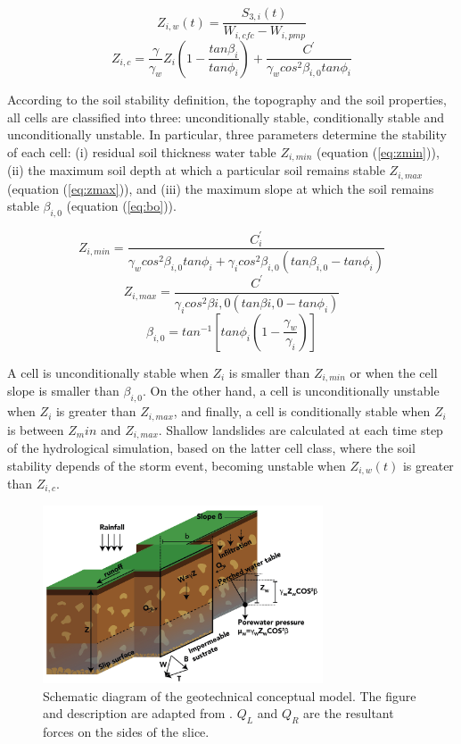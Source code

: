 \documentclass[hess, manuscript]{copernicus}
\begin{document}
\begin{equation}
 Z_{i,w}(t) = \frac{S_{3,i}(t)}{W_{i,cfc} - W_{i,pmp}}
 \label{eq:z}
\end{equation}
\begin{equation}
 Z_{i,c} = \frac{\gamma}{\gamma_w} Z_i \left( 1-\frac{tan \beta_i}{tan\phi_i} \right)
     + \frac{C^{'}}{\gamma_w cos^2 \beta_{i,0} tan\phi_i}
 \label{eq:Zcrit}
\end{equation}

According to the soil stability definition, the topography and the soil properties, all cells are classified into three: unconditionally stable, conditionally stable and unconditionally unstable. In particular, three parameters determine the stability of each cell: (i) residual soil thickness water table $Z_{i,min}$ (equation (\ref{eq:zmin})), (ii) the maximum soil depth at which a particular soil remains stable $Z_{i,max}$ (equation (\ref{eq:zmax})), and (iii) the maximum slope at which the soil remains stable $\beta_{i,0}$ (equation (\ref{eq:bo})). 

\begin{equation}
 Z_{i,min} = \frac{C^{'}_i}{\gamma_w cos^2 \beta_{i,0} tan \phi_i + \gamma_i cos^2 \beta_{i,0} (tan\beta_{i,0} - tan \phi_i)}
    \label{eq:zmin}
\end{equation}
\begin{equation}
 Z_{i,max} = \frac{C^{'}}{\gamma_i cos^2 \beta{i,0} (tan\beta{i,0} - tan \phi_i)}
 \label{eq:zmax}
\end{equation}
\begin{equation}
 \beta_{i,0} = tan ^{-1} \left[ tan \phi_i \left( 1- \frac{\gamma_w}{\gamma_i}\right) \right]
 \label{eq:bo}
\end{equation}

A cell is unconditionally stable when $Z_i$ is smaller than $Z_{i,min}$ or when the cell slope is smaller than $ \beta_{i,0}$. On the other hand, a cell is unconditionally unstable when $Z_i$ is greater than $Z_{i,max}$, and finally, a cell is conditionally stable when $Z_i$ is between $Z_min$ and $Z_{i,max}$. Shallow landslides are calculated at each time step of the hydrological simulation, based on the latter cell class, where the soil stability depends of the storm event, becoming unstable when $Z_{i,w}(t)$ is greater than $Z_{i,c}$.

\begin{figure}[t]
\centering
 \includegraphics[width=8.3cm]{Figures/slides-escheme.jpg}
 \caption{Schematic diagram of the geotechnical conceptual model. The figure and description are adapted from \citet{Aristizabal2016}. $Q_L$ and $Q_R$ are the resultant forces on the sides of the slice. }
    \label{fig:ModeloEstabilidad}
\end{figure}
\end{document}

